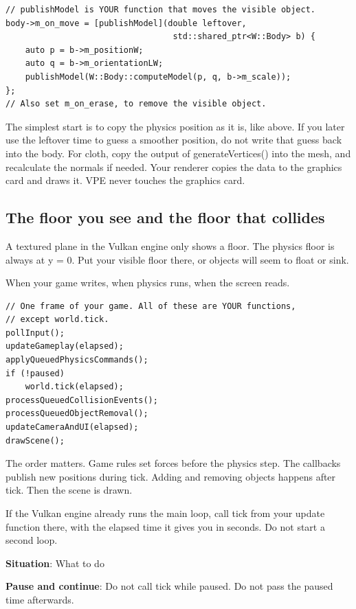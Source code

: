\documentclass[11pt,a4paper]{article}
\begin{document}
\begin{lstlisting}
// publishModel is YOUR function that moves the visible object.
body->m_on_move = [publishModel](double leftover,
                                  std::shared_ptr<W::Body> b) {
    auto p = b->m_positionW;
    auto q = b->m_orientationLW;
    publishModel(W::Body::computeModel(p, q, b->m_scale));
};
// Also set m_on_erase, to remove the visible object.
\end{lstlisting}

The simplest start is to copy the physics position as it is, like above. If you later use the leftover time to guess a smoother position, do not write that guess back into the body. For cloth, copy the output of generateVertices() into the mesh, and recalculate the normals if needed. Your renderer copies the data to the graphics card and draws it. VPE never touches the graphics card.

\subsection*{The floor you see and the floor that collides}
A textured plane in the Vulkan engine only shows a floor. The physics floor is always at y = 0. Put your visible floor there, or objects will seem to float or sink.

\label{vpe-core-23}
When your game writes, when physics runs, when the screen reads.

\begin{lstlisting}
// One frame of your game. All of these are YOUR functions,
// except world.tick.
pollInput();
updateGameplay(elapsed);
applyQueuedPhysicsCommands();
if (!paused)
    world.tick(elapsed);
processQueuedCollisionEvents();
processQueuedObjectRemoval();
updateCameraAndUI(elapsed);
drawScene();
\end{lstlisting}

The order matters. Game rules set forces before the physics step. The callbacks publish new positions during tick. Adding and removing objects happens after tick. Then the scene is drawn.

If the Vulkan engine already runs the main loop, call tick from your update function there, with the elapsed time it gives you in seconds. Do not start a second loop.

\textbf{Situation}: What to do

\textbf{Pause and continue}: Do not call tick while paused. Do not pass the paused time afterwards.
\end{document}
